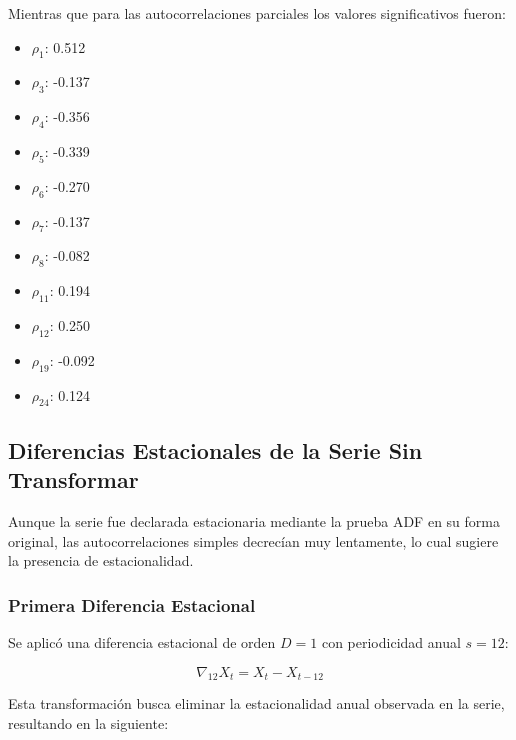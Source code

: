 \documentclass[12pt,letterpaper]{article}   %
\begin{document}
\vspace{1em}

\normalsize
Mientras que para las autocorrelaciones parciales los valores significativos fueron:
\begin{multicols}{5}
\scriptsize
\begin{itemize}
    \item $\rho_1$: 0.512
    \item $\rho_3$: -0.137
    \item $\rho_4$: -0.356
    \item $\rho_5$: -0.339
    \item $\rho_6$: -0.270
    \item $\rho_7$: -0.137
    \item $\rho_8$: -0.082
    \item $\rho_{11}$: 0.194
    \item $\rho_{12}$: 0.250
    \item $\rho_{19}$: -0.092
    \item $\rho_{24}$: 0.124
\end{itemize}
\end{multicols}{}

\vspace{1em}

\normalsize

\subsection{Diferencias Estacionales de la Serie Sin Transformar}

Aunque la serie fue declarada estacionaria mediante la prueba ADF en su forma original, las autocorrelaciones simples decrecían muy lentamente, lo cual sugiere la presencia de estacionalidad. 



\subsubsection{Primera Diferencia Estacional}

 Se aplicó una diferencia estacional de orden \( D = 1 \) con periodicidad anual \( s = 12 \):

\[
\nabla_{12} X_t = X_t - X_{t-12}
\]

Esta transformación busca eliminar la estacionalidad anual observada en la serie, resultando en la siguiente:
\end{document}
